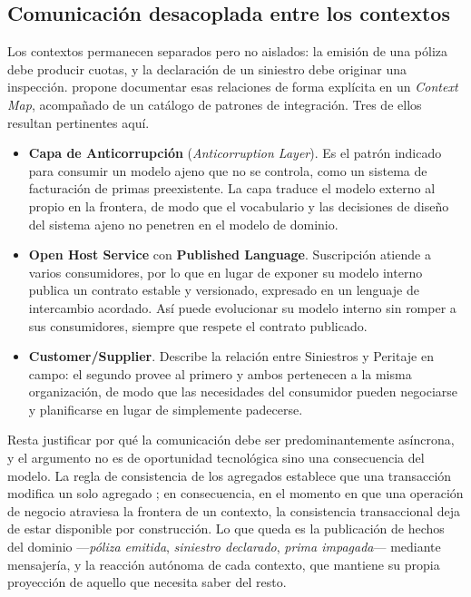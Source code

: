 \subsection*{Comunicación desacoplada entre los contextos}

Los contextos permanecen separados pero no aislados: la emisión de una póliza debe producir cuotas,
y la declaración de un siniestro debe originar una inspección. \textcite{evans2003} propone
documentar esas relaciones de forma explícita en un \emph{Context Map}, acompañado de un catálogo de
patrones de integración. Tres de ellos resultan pertinentes aquí.

\begin{itemize}
  \item \textbf{Capa de Anticorrupción} (\emph{Anticorruption Layer}). Es el patrón indicado para
  consumir un modelo ajeno que no se controla, como un sistema de facturación de primas preexistente.
  La capa traduce el modelo externo al propio en la frontera, de modo que el vocabulario y las
  decisiones de diseño del sistema ajeno no penetren en el modelo de dominio.

  \item \textbf{Open Host Service} con \textbf{Published Language}. Suscripción atiende a varios
  consumidores, por lo que en lugar de exponer su modelo interno publica un contrato estable y
  versionado, expresado en un lenguaje de intercambio acordado. Así puede evolucionar su modelo
  interno sin romper a sus consumidores, siempre que respete el contrato publicado.

  \item \textbf{Customer/Supplier}. Describe la relación entre Siniestros y Peritaje en campo: el
  segundo provee al primero y ambos pertenecen a la misma organización, de modo que las necesidades
  del consumidor pueden negociarse y planificarse en lugar de simplemente padecerse.
\end{itemize}

Resta justificar por qué la comunicación debe ser predominantemente asíncrona, y el argumento no es
de oportunidad tecnológica sino una consecuencia del modelo. La regla de consistencia de los
agregados establece que una transacción modifica un solo agregado \parencite{evans2003}; en
consecuencia, en el momento en que una operación de negocio atraviesa la frontera de un contexto, la
consistencia transaccional deja de estar disponible por construcción. Lo que queda es la
publicación de hechos del dominio ---\emph{póliza emitida}, \emph{siniestro declarado},
\emph{prima impagada}--- mediante mensajería, y la reacción autónoma de cada contexto, que mantiene
su propia proyección de aquello que necesita saber del resto.

